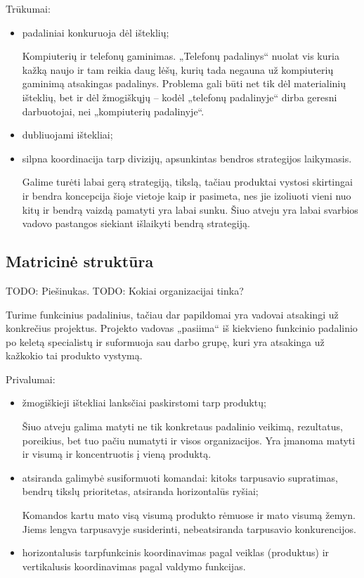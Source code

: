 Trūkumai:
\begin{itemize}
  \item padaliniai konkuruoja dėl išteklių;
    \begin{exmp}
      Kompiuterių ir telefonų gaminimas. „Telefonų padalinys“ nuolat
      vis kuria kažką naujo ir tam reikia daug lėšų, kurių tada negauna
      už kompiuterių gaminimą atsakingas padalinys. Problema gali būti
      net tik dėl materialinių išteklių, bet ir dėl žmogiškųjų – kodėl
      „telefonų padalinyje“ dirba geresni darbuotojai, nei „kompiuterių
      padalinyje“.
    \end{exmp}
  \item dubliuojami ištekliai;
  \item silpna koordinacija tarp divizijų, apsunkintas bendros strategijos
    laikymasis.
    \begin{note}
      Galime turėti labai gerą strategiją, tikslą, tačiau produktai
      vystosi skirtingai ir bendra koncepcija šioje vietoje kaip ir
      pasimeta, nes jie izoliuoti vieni nuo kitų ir bendrą vaizdą
      pamatyti yra labai sunku. Šiuo atveju yra labai svarbios
      vadovo pastangos siekiant išlaikyti bendrą strategiją.
    \end{note}
\end{itemize}

\subsection{Matricinė struktūra}

TODO: Piešinukas.
TODO: Kokiai organizacijai tinka?

Turime funkcinius padalinius, tačiau dar papildomai yra vadovai
atsakingi už konkrečius projektus. Projekto vadovas „pasiima“ iš
kiekvieno funkcinio padalinio po keletą specialistų ir suformuoja
sau darbo grupę, kuri yra atsakinga už kažkokio tai produkto vystymą.

Privalumai:
\begin{itemize}
  \item žmogiškieji ištekliai lanksčiai paskirstomi tarp produktų;
    \begin{note}
      Šiuo atveju galima matyti ne tik konkretaus padalinio veikimą,
      rezultatus, poreikius, bet tuo pačiu numatyti ir visos
      organizacijos. Yra įmanoma matyti ir visumą ir koncentruotis į
      vieną produktą.
    \end{note}
  \item atsiranda galimybė susiformuoti komandai: kitoks tarpusavio 
    supratimas, bendrų tikslų prioritetas, atsiranda horizontalūs
    ryšiai;
    \begin{note}
      Komandos kartu mato visą visumą produkto rėmuose ir mato visumą
      žemyn. Jiems lengva tarpusavyje susiderinti, nebeatsiranda
      tarpusavio konkurencijos.
    \end{note}
  \item horizontalusis tarpfunkcinis koordinavimas pagal veiklas 
    (produktus) ir vertikalusis koordinavimas pagal valdymo funkcijas.
\end{itemize}

